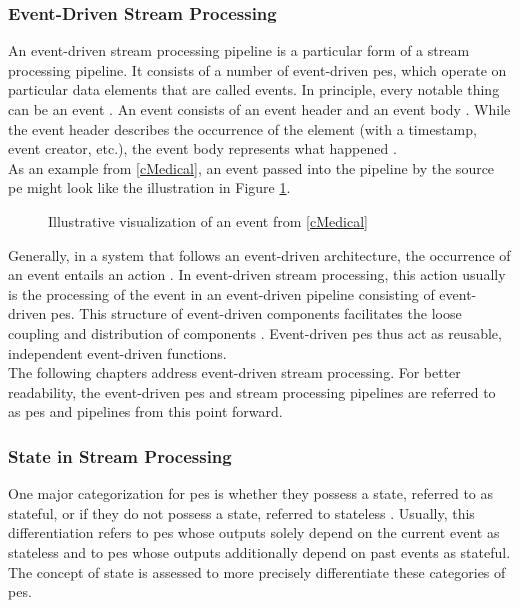 \subsubsection{Event-Driven Stream Processing}
\label{lEventDrivenStreamProcessing}

An event-driven stream processing pipeline is a particular form of a stream processing pipeline. It consists of a number of event-driven \gls{pe}s, which operate on particular data elements that are called events. In principle, every notable thing can be an event \cite{Michelson.2006}. An event consists of an event header and an event body \cite{Michelson.2006}. While the event header describes the occurrence of the element (with a timestamp, event creator, etc.), the event body represents what happened \cite{Michelson.2006}.\\
As an example from \ref{cMedical}, an event passed into the pipeline by the source \gls{pe} might look like the illustration in Figure \ref{fMedicalEvent}.\par

\begin{figure}[H]
    \centering
    \graphicspath{{./figures/code/}}

\caption{Illustrative visualization of an event from \ref{cMedical}}
\label{fMedicalEvent}
\end{figure}

Generally, in a system that follows an event-driven architecture, the occurrence of an event entails an action \cite{Michelson.2006}. In event-driven stream processing, this action usually is the processing of the event in an event-driven pipeline consisting of event-driven \gls{pe}s. This structure of event-driven components facilitates the loose coupling and distribution of components \cite{Michelson.2006}. Event-driven \gls{pe}s thus act as reusable, independent event-driven functions.\\
The following chapters address event-driven stream processing. For better readability, the event-driven \gls{pe}s and stream processing pipelines are referred to as \gls{pe}s and pipelines from this point forward.


\subsubsection{State in Stream Processing}
\label{lStateStreamProcessing}

One major categorization for \gls{pe}s is whether they possess a state, referred to as stateful, or if they do not possess a state, referred to stateless \cite{CastroFernandez.2013}. 
Usually, this differentiation refers to \gls{pe}s whose outputs solely depend on the current event as stateless and to \gls{pe}s whose outputs additionally depend on past events as stateful. The concept of state is assessed to more precisely differentiate these categories of \gls{pe}s.\par

